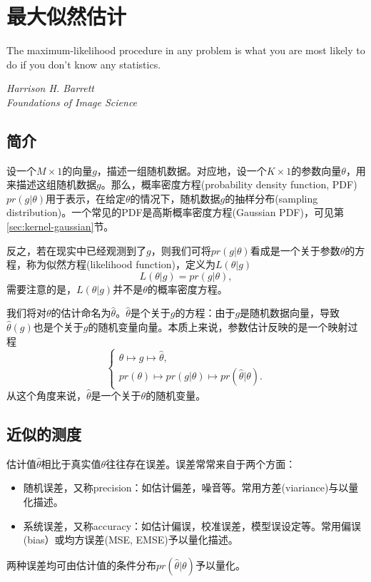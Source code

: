 
\chapter{最大似然估计}
\label{sec:mle}

\epigraph{The maximum-likelihood procedure in any problem is what you are most likely to do if you don’t know any statistics.}{\textit{Harrison H. Barrett \\ Foundations of Image Science}}

\section{简介}
\label{sec:mle-intro}
设一个$M \times 1$的向量$g$，描述一组随机数据。对应地，设一个$K \times 1$的参数向量$\theta$，用来描述这组随机数据$g$。那么，概率密度方程(probability density function, PDF) $pr(g|\theta)$用于表示，在给定$\theta$的情况下，随机数据$g$的抽样分布(sampling distribution)。一个常见的PDF是高斯概率密度方程(Gaussian PDF)，可见第\ref{sec:kernel-gaussian}节。

反之，若在现实中已经观测到了$g$，则我们可将$pr(g|\theta)$看成是一个关于参数$\theta$的方程，称为似然方程(likelihood function)，定义为$L(\theta | g)$
\begin{equation*}
  L(\theta | g) = pr(g | \theta),
\end{equation*}
需要注意的是，$L(\theta | g)$并不是$\theta$的概率密度方程。

我们将对$\theta$的估计命名为$\hat{\theta}$。$\hat{\theta}$是个关于$g$的方程：由于$g$是随机数据向量，导致$\hat{\theta}(g)$也是个关于$g$的随机变量向量。本质上来说，参数估计反映的是一个映射过程
\begin{equation*}
  \begin{cases}
    \theta \mapsto g \mapsto \hat{\theta}, \\
    pr(\theta) \mapsto pr(g | \theta) \mapsto pr(\hat{\theta} | \theta).
  \end{cases}
\end{equation*}
从这个角度来说，$\hat{\theta}$是一个关于$\theta$的随机变量。

\section{近似的测度}
\label{sec:mle-performance-metrics}
估计值$\hat{\theta}$相比于真实值$\theta$往往存在误差。误差常常来自于两个方面：
\begin{itemize}
  \item 随机误差，又称precision：如估计偏差，噪音等。常用方差(viariance)与以量化描述。
  \item 系统误差，又称accuracy：如估计偏误，校准误差，模型误设定等。常用偏误(bias）或均方误差(MSE, EMSE)予以量化描述。
\end{itemize}
两种误差均可由估计值的条件分布$pr(\hat{\theta} | \theta)$予以量化。

